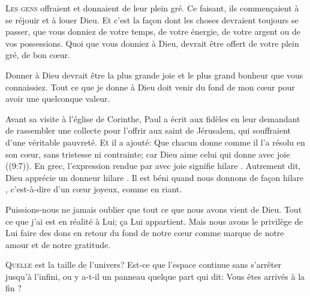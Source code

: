 \lettrine{L}{es gens} offraient et donnaient de leur plein gré.
 Ce faisant, ils commen\c{c}aient à se réjouir et à louer Dieu.
 Et c'est la fa\c{c}on dont les choses devraient toujours se passer,
 que vous donniez de votre temps, de votre énergie, de votre argent
 ou de vos possessions.
 Quoi que vous donniez à Dieu, devrait être offert de votre plein gré,
 de bon c\oe{}ur. 

Donner à Dieu devrait être la plus grande joie et le plus grand bonheur
 que vous connaissiez.
 Tout ce que je donne à Dieu doit venir du fond de mon c\oe{}ur
 pour avoir une quelconque valeur. 


Avant sa visite à l'église de Corinthe, Paul a écrit aux fidèles
 en leur demandant de rassembler une collecte pour l'offrir
 aux saint de Jérusalem, qui souffraient d'une véritable pauvreté.
 Et il a ajouté:
 \Og Que chacun donne comme il l'a résolu en son c\oe{}ur, sans tristesse
 ni contrainte; car Dieu aime celui qui donne avec joie \Fg{}
 ((9:7)).
 En grec, l'expression rendue par \Og avec joie \Fg{} signifie
 \Og hilare \Fg{}. Autrement dit, Dieu apprécie un \Og donneur hilare \Fg{}.
 Il est béni quand nous donnons de fa\c{c}on \Og hilare \Fg{},
 c'est-à-dire d'un c\oe{}ur joyeux, comme en riant. 

Puissions-nous ne jamais oublier que tout ce que nous avons vient de Dieu.
 Tout ce que j'ai est en réalité à Lui; \c{c}a Lui appartient.
 Mais nous avons le privilège de Lui faire des dons en retour
 \ocadr du fond de notre c\oe{}ur \fcadr{} comme marque de notre amour
 et de notre gratitude. 

\dvrule






\lettrine{Q}{uelle} est la taille de l'univers?
 Est-ce que l'espace continue sans s'arrêter jusqu'à l'infini,
 ou y a-t-il un panneau quelque part qui dit:
 \Og Vous êtes arrivés à la fin \Fg{} ? 

